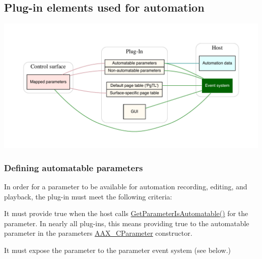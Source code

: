 \hypertarget{a00819_parameterAutomation_elements}{}\subsection{Plug-\/in elements used for automation}\label{a00819_parameterAutomation_elements}
 
\begin{DoxyImage}
\includegraphics[width=\textwidth,height=\textheight/2,keepaspectratio=true]{dot_aax_automation_components}
\end{DoxyImage}
 \hypertarget{a00819_parameterAutomation_definingParameters}{}\subsubsection{Defining automatable parameters}\label{a00819_parameterAutomation_definingParameters}
 In order for a parameter to be available for automation recording, editing, and playback, the plug-\/in must meet the following criteria\+: \begin{DoxyItemize}
\item It must provide {\ttfamily true} when the host calls \mbox{\hyperlink{a01669_a4e6eeef25a797ea4c6961df45174b169}{Get\+Parameter\+Is\+Automatable()}} for the parameter. In nearly all plug-\/ins, this means providing {\ttfamily true} to the {\ttfamily automatable} parameter in the parameter\textquotesingle{}s \mbox{\hyperlink{a01537}{A\+A\+X\+\_\+\+C\+Parameter}} constructor. \item It must expose the parameter to the parameter event system (see below.)\end{DoxyItemize}
